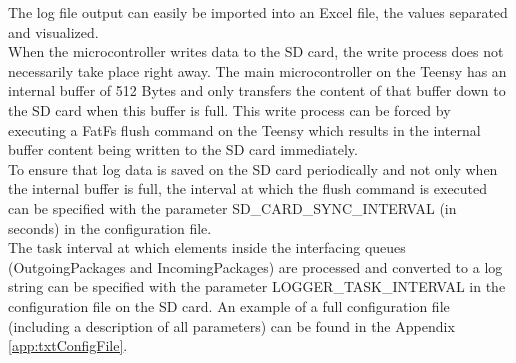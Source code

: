 %
The log file output can easily be imported into an Excel file, the values separated and visualized.\\
When the microcontroller writes data to the SD card, the write process does not necessarily take place right away. The main microcontroller on the Teensy has an internal buffer of 512 Bytes and only transfers the content of that buffer down to the SD card when this buffer is full. This write process can be forced by executing a FatFs flush command on the Teensy which results in the internal buffer content being written to the SD card immediately.\\
To ensure that log data is saved on the SD card periodically and not only when the internal buffer is full, the interval at which the flush command is executed can be specified with the parameter SD\_CARD\_SYNC\_INTERVAL (in seconds) in the configuration file.\\
The task interval at which elements inside the interfacing queues (OutgoingPackages and IncomingPackages) are processed and converted to a log string can be specified with the parameter LOGGER\_TASK\_INTERVAL in the configuration file on the SD card. An example of a full configuration file (including a description of all parameters) can be found in the Appendix \autoref{app:txtConfigFile}.
%

